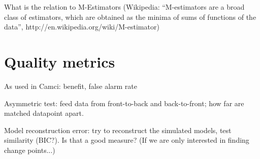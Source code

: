 What is the relation to M-Estimators (Wikipedia: ``M-estimators are a broad class of estimators, which are obtained as the minima of sums of functions of the data'', http://en.wikipedia.org/wiki/M-estimator)


\section{Quality metrics}
As used in Camci: benefit, false alarm rate

Asymmetric test: feed data from front-to-back and back-to-front; how far are matched datapoint apart.

Model reconstruction error: try to reconstruct the simulated models, test similarity (BIC?). Is that a good measure? (If we are only interested in finding change points...)

